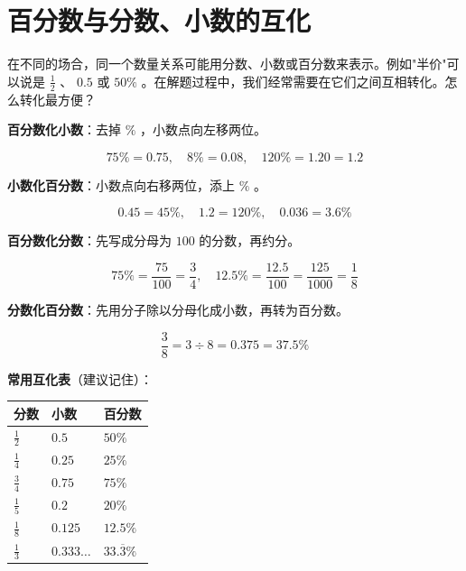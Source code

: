 \section*{百分数与分数、小数的互化}


\begin{explore}


在不同的场合，同一个数量关系可能用分数、小数或百分数来表示。例如"半价"可以说是 $\frac{1}{2}$ 、 $0.5$ 或 $50\%$ 。在解题过程中，我们经常需要在它们之间互相转化。怎么转化最方便？

\end{explore}

\begin{understand}


\textbf{百分数化小数}：去掉 $\%$ ，小数点向左移两位。

\[
75\% = 0.75, \quad 8\% = 0.08, \quad 120\% = 1.20 = 1.2
\]


\textbf{小数化百分数}：小数点向右移两位，添上 $\%$ 。

\[
0.45 = 45\%, \quad 1.2 = 120\%, \quad 0.036 = 3.6\%
\]


\textbf{百分数化分数}：先写成分母为 $100$ 的分数，再约分。

\[
75\% = \frac{75}{100} = \frac{3}{4}, \quad 12.5\% = \frac{12.5}{100} = \frac{125}{1000} = \frac{1}{8}
\]


\textbf{分数化百分数}：先用分子除以分母化成小数，再转为百分数。

\[
\frac{3}{8} = 3 \div 8 = 0.375 = 37.5\%
\]


\textbf{常用互化表}（建议记住）：

\begin{center}
\begin{tabular}{lll}
\toprule
分数 & 小数 & 百分数 \\
\midrule
$\frac{1}{2}$ & $0.5$ & $50\%$ \\
$\frac{1}{4}$ & $0.25$ & $25\%$ \\
$\frac{3}{4}$ & $0.75$ & $75\%$ \\
$\frac{1}{5}$ & $0.2$ & $20\%$ \\
$\frac{1}{8}$ & $0.125$ & $12.5\%$ \\
$\frac{1}{3}$ & $0.333\ldots$ & $33.\overline{3}\%$ \\
\bottomrule
\end{tabular}
\end{center}


\end{understand}

